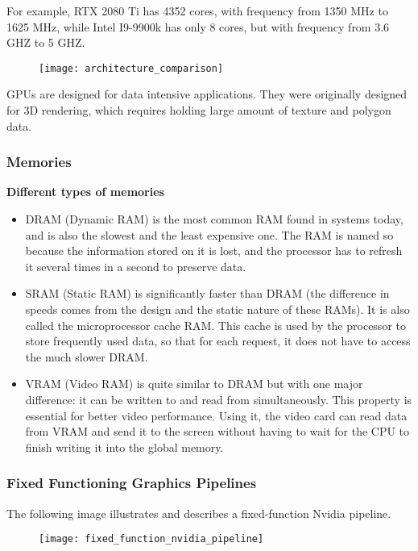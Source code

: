 \documentclass[../notes.tex]{subfiles}
\begin{document}
{\color{blue} For example, RTX 2080 Ti has 4352 cores, with frequency from 1350 MHz to 1625 MHz, while Intel I9-9900k has only 8 cores, but with frequency from 3.6 GHZ to 5 GHZ.}

\begin{figure}[h]
  \texttt{[image: architecture\_comparison]}
\end{figure}

GPUs are designed for data intensive applications. They were originally designed for 3D rendering, which requires holding large amount of texture and polygon data.

\subsubsection{Memories}
\textbf{Different types of memories}
\begin{itemize}
  \item DRAM (Dynamic RAM) is the most common RAM found in systems today, and is also the slowest and the least expensive one. The RAM is named so because the information stored on it is lost, and the processor has to refresh it several times in a second to preserve data.
  \item SRAM (Static RAM) is significantly faster than DRAM (the difference in speeds comes from the design and the static nature of these RAMs). It is also called the microprocessor cache RAM. This cache is used by the processor to store frequently used data, so that for each request, it does not have to access the much slower DRAM.
  \item VRAM (Video RAM) is quite similar to DRAM but with one major difference: it can be written to and read from simultaneously. This property is essential for better video performance. Using it, the video card can read data from VRAM and send it to the screen without having to wait for the CPU to finish writing it into the global memory.
\end{itemize}

\newpage

\subsubsection{Fixed Functioning Graphics Pipelines}
The following image illustrates and describes a fixed-function Nvidia pipeline.
\begin{figure}[ht]
  \texttt{[image: fixed\_function\_nvidia\_pipeline]}
\end{figure}
\end{document}
